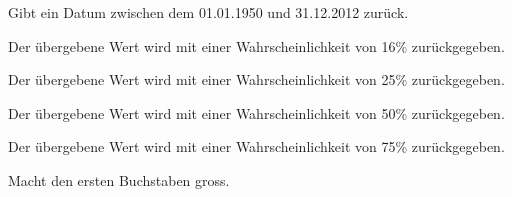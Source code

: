\documentclass[a4paper,12pt,oneside]{sphinxmanual}
\begin{document}

\begin{fulllineitems}
\label{funktionen:pyzufall.datum}
Gibt ein Datum zwischen dem 01.01.1950 und 31.12.2012 zurück.

\end{fulllineitems}


\begin{fulllineitems}
\label{funktionen:pyzufall.e16}
Der übergebene Wert wird mit einer Wahrscheinlichkeit von 16\% zurückgegeben.

\end{fulllineitems}


\begin{fulllineitems}
\label{funktionen:pyzufall.e25}
Der übergebene Wert wird mit einer Wahrscheinlichkeit von 25\% zurückgegeben.

\end{fulllineitems}


\begin{fulllineitems}
\label{funktionen:pyzufall.e50}
Der übergebene Wert wird mit einer Wahrscheinlichkeit von 50\% zurückgegeben.

\end{fulllineitems}


\begin{fulllineitems}
\label{funktionen:pyzufall.e75}
Der übergebene Wert wird mit einer Wahrscheinlichkeit von 75\% zurückgegeben.

\end{fulllineitems}


\begin{fulllineitems}
\label{funktionen:pyzufall.ersten_buchstaben_gross}
Macht den ersten Buchstaben gross.

\end{fulllineitems}
\end{document}
